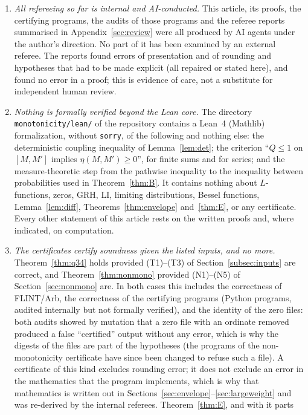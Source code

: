 \documentclass[11pt]{amsart}
\theoremstyle{definition}
\numberwithin{equation}{section}
\begin{document}
\begin{enumerate}
\item \emph{All refereeing so far is internal and AI-conducted.} This
article, its proofs, the certifying programs, the audits of those
programs and the referee reports summarised in
Appendix~\ref{sec:review} were all produced by AI agents under the
author's direction. No part of it has been examined by an external
referee. The reports found errors of presentation and of rounding
and hypotheses that had to be made explicit (all repaired or stated
here), and found no error in a proof; this is evidence of care, not a
substitute for independent human review.
\item \emph{Nothing is formally verified beyond the Lean core.} The
directory \texttt{monotonicity/lean/} of the repository contains a
Lean~4 (Mathlib) formalization, without \texttt{sorry}, of the
following and nothing else: the deterministic coupling inequality of
Lemma~\ref{lem:det}; the criterion ``$Q\le1$ on $[M,M']$ implies
$\eta(M,M')\ge0$'', for finite sums and for series; and the
measure-theoretic step from the pathwise inequality to the inequality
between probabilities used in Theorem~\ref{thm:B}. It contains
nothing about $L$-functions, zeros, GRH, LI, limiting distributions,
Bessel functions, Lemma~\ref{lem:diff}, Theorems~\ref{thm:envelope}
and~\ref{thm:E}, or any certificate. Every other statement of this
article rests on the written proofs and, where indicated, on
computation.
\item \emph{The certificates certify soundness given the listed
inputs, and no more.} Theorem~\ref{thm:q34} holds provided
(T1)--(T3) of Section~\ref{subsec:inputs} are correct, and
Theorem~\ref{thm:nonmono} provided (N1)--(N5) of
Section~\ref{sec:nonmono} are. In both cases this includes the
correctness of FLINT/Arb, the correctness of the certifying programs
(Python programs, audited internally but not formally verified), and the identity of the zero files:
both audits showed by mutation that a zero file with an ordinate
removed produced a false ``certified'' output without any error, which
is why the digests of the files are part of the hypotheses (the
programs of the non-monotonicity certificate have since been changed
to refuse such a file). A
certificate of this kind excludes rounding error; it does not exclude
an error in the mathematics that the program implements, which is why
that mathematics is written out in
Sections~\ref{sec:envelope}--\ref{sec:largeweight} and was re-derived
by the internal referees. Theorem~\ref{thm:E}, and with it parts

\end{enumerate}
\end{document}

